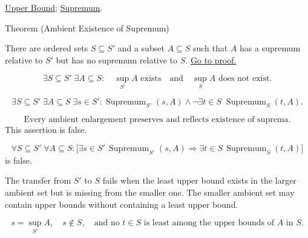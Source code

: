 \begin{remark*}[Dependencies]
\hyperref[def:upper-bound]{Upper Bound};
\hyperref[def:supremum]{Supremum}.
\end{remark*}


\begin{theorembox}{Theorem (Ambient Existence of Supremum)}
\begin{theorem}
\label{thm:ambient-existence-supremum}
There are ordered sets $S\subseteq S'$ and a subset $A\subseteq S$ such that $A$ has a supremum relative to $S'$ but has no supremum relative to $S$.
\hyperref[prf:ambient-existence-supremum]{Go to proof.}
\end{theorem}
\end{theorembox}

\begin{remark*}
\[
\exists S\subseteq S'\;\exists A\subseteq S:
\quad
\sup_{S'} A\text{ exists}
\quad\text{and}\quad
\sup_S A\text{ does not exist}.
\]
\end{remark*}

\begin{remark*}
\[
\exists S\subseteq S'\;\exists A\subseteq S\;\exists s\in S':
\operatorname{Supremum}_{S'}(s,A)
\land
\neg\exists t\in S\;\operatorname{Supremum}_S(t,A).
\]
\end{remark*}

\begin{remark*}
\[
\text{Every ambient enlargement preserves and reflects existence of suprema.}
\]
This assertion is false.
\end{remark*}

\begin{remark*}
\[
\forall S\subseteq S'\;\forall A\subseteq S:
\bigl[\exists s\in S'\,\operatorname{Supremum}_{S'}(s,A)
\Longrightarrow
\exists t\in S\,\operatorname{Supremum}_S(t,A)\bigr]
\]
is false.
\end{remark*}

\begin{remark*}
The transfer from $S'$ to $S$ fails when the least upper bound exists in the larger ambient set but is missing from the smaller one. The smaller ambient set may contain upper bounds without containing a least upper bound.
\end{remark*}

\begin{remark*}
\[
s=\sup_{S'} A,\quad s\notin S,\quad
\text{and no }t\in S\text{ is least among the upper bounds of }A\text{ in }S.
\]
\end{remark*}

